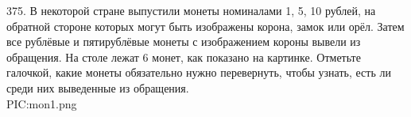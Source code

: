 375. В некоторой стране выпустили монеты номиналами 1, 5, 10 рублей, на обратной стороне которых
могут быть изображены корона, замок или орёл. Затем все рублёвые и пятирублёвые монеты с
изображением короны вывели из обращения. На столе лежат 6 монет, как показано на картинке.
Отметьте галочкой, какие монеты обязательно нужно перевернуть, чтобы узнать, есть ли среди них
выведенные из обращения.\\
{{PIC:mon1.png}}\\
